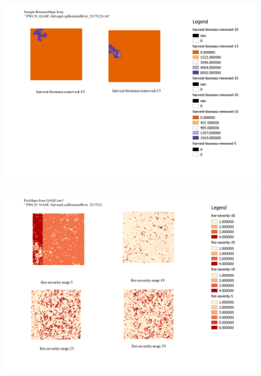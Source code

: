 \documentclass[twoside]{article}	%
\begin{document}
\begin{figure}[!htbp]
  \begin{center}
    \includegraphics[scale = 0.6]{graphics/PWL50_BiomassMaps_QAQCrun1}
    \caption{}
    \label{fig:}
  \end{center}
\end{figure}

\begin{figure}[!htbp]
  \begin{center}
    \includegraphics[scale = 0.6]{graphics/PWL50_FireMaps_QAQCrun5}
    \caption{}
    \label{fig:}
  \end{center}
\end{figure}


\newpage


\end{document}
